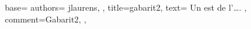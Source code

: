 {
  base={
    authors={
      jlaurens,
    },
    title=gabarit2,
    text={
      Un  est  de l'….
    },
    comment={Gabarit2},
  },
}
